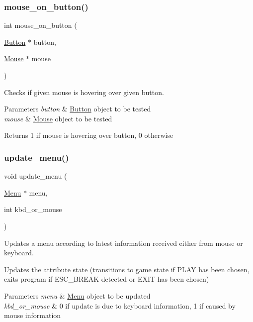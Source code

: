 \subsubsection{\texorpdfstring{mouse\+\_\+on\+\_\+button()}{mouse\_on\_button()}}
{\footnotesize\ttfamily int mouse\+\_\+on\+\_\+button (\begin{DoxyParamCaption}\item[{\hyperlink{struct_button}{Button} $\ast$}]{button,  }\item[{\hyperlink{struct_mouse}{Mouse} $\ast$}]{mouse }\end{DoxyParamCaption})}



Checks if given mouse is hovering over given button. 


\begin{DoxyParams}{Parameters}
{\em button} & \hyperlink{struct_button}{Button} \textquotesingle{}object\textquotesingle{} to be tested \\
\hline
{\em mouse} & \hyperlink{struct_mouse}{Mouse} \textquotesingle{}object\textquotesingle{} to be tested \\
\hline
\end{DoxyParams}
\begin{DoxyReturn}{Returns}
1 if mouse is hovering over button, 0 otherwise 
\end{DoxyReturn}
\hypertarget{group__menu_ga99bc2dfd43702a29bdcef45fea2f8391}{}\label{group__menu_ga99bc2dfd43702a29bdcef45fea2f8391} 
\subsubsection{\texorpdfstring{update\+\_\+menu()}{update\_menu()}}
{\footnotesize\ttfamily void update\+\_\+menu (\begin{DoxyParamCaption}\item[{\hyperlink{struct_menu}{Menu} $\ast$}]{menu,  }\item[{int}]{kbd\+\_\+or\+\_\+mouse }\end{DoxyParamCaption})}



Updates a menu according to latest information received either from mouse or keyboard. 

Updates the attribute \textquotesingle{}state\textquotesingle{} (transitions to game state if P\+L\+AY has been chosen, exits program if E\+S\+C\+\_\+\+B\+R\+E\+AK detected or E\+X\+IT has been chosen)


\begin{DoxyParams}{Parameters}
{\em menu} & \hyperlink{struct_menu}{Menu} \textquotesingle{}object\textquotesingle{} to be updated \\
\hline
{\em kbd\+\_\+or\+\_\+mouse} & 0 if update is due to keyboard information, 1 if caused by mouse information \\
\hline
\end{DoxyParams}
